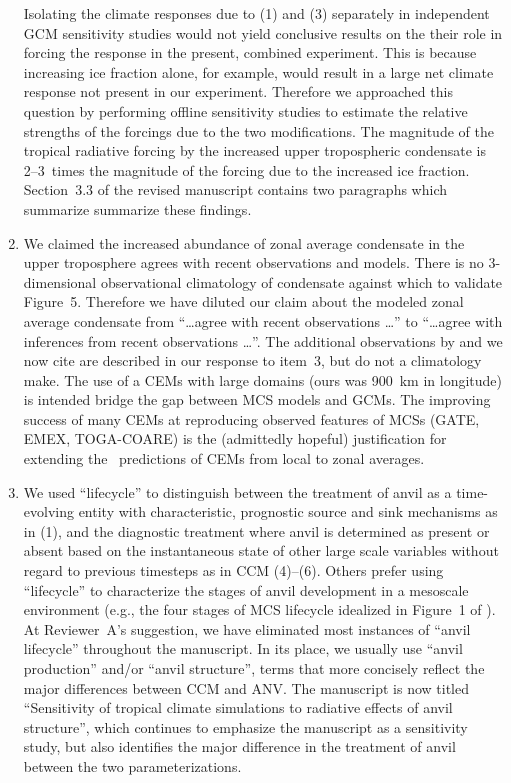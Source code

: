 \documentclass[12pt,twoside]{article}
\begin{document}
\begin{enumerate}
Isolating the climate responses due to (1) and (3) separately in 
independent GCM sensitivity studies would not yield conclusive
results on the their role in forcing the response in the present,
combined experiment. 
This is because increasing ice fraction alone, for example, would
result in a large net climate response not present in our experiment.
Therefore we approached this question by performing offline
sensitivity studies to estimate the relative strengths of the
forcings due to the two modifications. 
The magnitude of the tropical radiative forcing by the increased upper
tropospheric condensate is 2--3~times the magnitude of the forcing due
to the increased ice fraction. 
Section~3.3 of the revised manuscript contains two paragraphs which 
summarize summarize these findings.

\item We claimed the increased abundance of zonal average condensate
in the upper troposphere agrees with recent observations and models. 
There is no 3-dimensional observational climatology of condensate
against which to validate Figure~5.
Therefore we have diluted our claim about the modeled zonal average
condensate from ``\ldots agree with recent observations \ldots'' to
``\ldots agree with inferences from recent observations \ldots''.  
The additional observations by \cite{McH96} and \cite{McH971} we now
cite are described in our response to item~3, but do not a climatology
make.  
The use of a CEMs with large domains (ours was 900~km in longitude) is
intended bridge the gap between MCS models and GCMs. 
The improving success of many CEMs at reproducing observed features of
MCSs (GATE, EMEX, TOGA-COARE) is the (admittedly hopeful)
justification for extending the \qi\ predictions of CEMs from local to
zonal averages.  

\item We used ``lifecycle'' to distinguish between the treatment of
anvil as a time-evolving entity with characteristic, prognostic source
and sink mechanisms as in (1), and the diagnostic treatment where
anvil is determined as present or absent based on the instantaneous
state of other large scale variables without regard to previous
timesteps as in CCM (4)--(6).  
Others prefer using ``lifecycle'' to characterize the stages of anvil
development in a mesoscale environment (e.g., the four stages of MCS
lifecycle idealized in Figure~1 of \cite{Hou89}).    
At Reviewer~A's suggestion, we have eliminated most instances of
``anvil lifecycle'' throughout the manuscript. 
In its place, we usually use ``anvil production'' and/or ``anvil
structure'', terms that more concisely reflect the major differences
between CCM and ANV.
The manuscript is now titled ``Sensitivity of tropical climate
simulations to radiative effects of anvil structure'', which continues
to emphasize the manuscript as a sensitivity study, but also
identifies the major difference in the treatment of anvil between the
two parameterizations.  


\end{enumerate}
\end{document}
